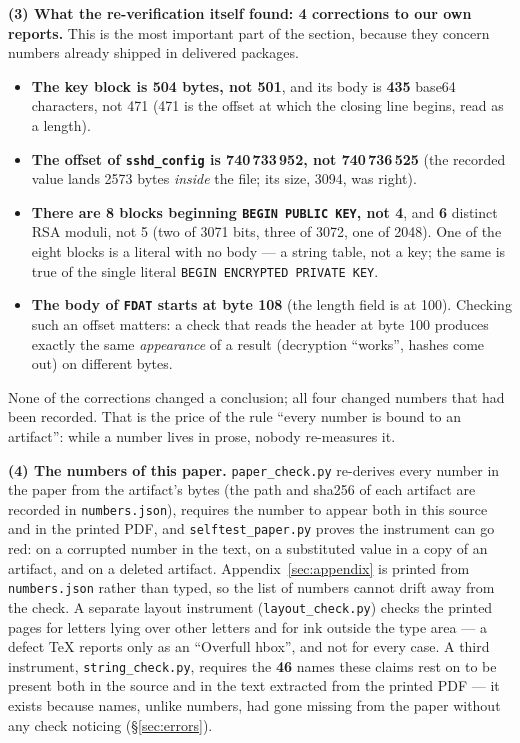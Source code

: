 \documentclass[12pt]{article}
\newcommand{\code}[1]{\texttt{\small #1}}
\newcommand{\lc}[1]{\texttt{\small #1}}
\begin{document}
\textbf{(3) What the re-verification itself found: 4 corrections to our own reports.}
This is the most important part of the section, because they concern numbers already shipped
in delivered packages.

\begin{itemize}
\item \textbf{The key block is 504 bytes, not 501}, and its body is \textbf{435} base64
characters, not 471 (471 is the offset at which the closing line begins, read as a length).
\item \textbf{The offset of \code{sshd\_config} is 740\,733\,952, not 740\,736\,525} (the
recorded value lands 2573 bytes \emph{inside} the file; its size, 3094, was right).
\item \textbf{There are 8 blocks beginning \code{BEGIN PUBLIC KEY}, not 4}, and \textbf{6}
distinct RSA moduli, not 5 (two of 3071 bits, three of 3072, one of 2048). One of the eight
blocks is a literal with no body --- a string table, not a key; the same is true of the single
literal \lc{BEGIN EN\allowbreak CRYPTED \allowbreak PRIVATE \allowbreak KEY}.
\item \textbf{The body of \code{FDAT} starts at byte 108} (the length field is at 100).
Checking such an offset matters: a check that reads the header at byte 100 produces exactly the
same \emph{appearance} of a result (decryption ``works'', hashes come out) on different bytes.
\end{itemize}

None of the corrections changed a conclusion; all four changed numbers that had been recorded.
That is the price of the rule ``every number is bound to an artifact'': while a number lives in
prose, nobody re-measures it.

\textbf{(4) The numbers of this paper.} \code{paper\_check.py} re-derives every
number in the paper from the artifact's bytes (the path and sha256 of each artifact are
recorded in \code{numbers.json}), requires the number to appear both in this source and in the
printed PDF, and \code{selftest\_paper.py} proves the instrument can go red: on a
corrupted number in the text, on a substituted value in a copy of an artifact, and on a deleted
artifact. Appendix~\ref{sec:appendix} is printed from \code{numbers.json} rather than typed, so
the list of numbers cannot drift away from the check. A separate layout instrument
(\code{layout\_check.py}) checks the printed pages for letters lying over other
letters and for ink outside the type area --- a defect TeX reports only as an ``Overfull
hbox'', and not for every case. A third instrument, \code{string\_check.py}, requires the
\textbf{46} names these claims rest on to be present both in the source and in the text
extracted from the printed PDF --- it exists because names, unlike numbers, had gone missing
from the paper without any check noticing (\S\ref{sec:errors}).
\end{document}
